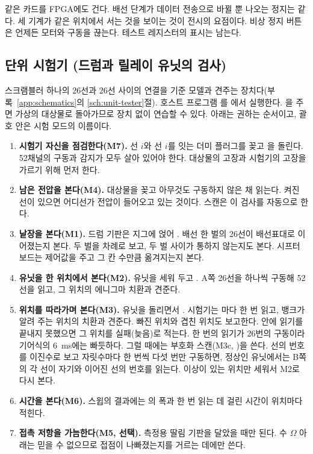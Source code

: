같은 카드를 FPGA에도 건다. 배선 단계가 데이터 전송으로 바뀔 뿐 나오는 정지는 같다. 세 기계가 같은 위치에서
서는 것을 보이는 것이 전시의 요점이다. 비상 정지 버튼은 언제든 모터와 구동을 끊는다. 테스트 레지스터의 표시는
남는다.

\subsection{단위 시험기 (드럼과 릴레이 유닛의 검사)}

스크램블러 하나의 26선과 26선 사이의 연결을 기준 모델과 견주는 장치다(부록~\ref{app:schematics}의
\ref{sch:unit-tester}절). 호스트 프로그램 를
에서 실행한다. 을 주면 가상의 대상물로 돌아가므로 장치 없이
연습할 수 있다. 아래는 권하는 순서이고, 괄호 안은 시험 모드의 이름이다.

\begin{enumerate}
\item \textbf{시험기 자신을 점검한다(M7).} 선 $i$와 선 $i$를 잇는 더미 플러그를 꽂고 을
돌린다. 52채널의 구동과 감지가 모두 살아 있어야 한다. 대상물의 고장과 시험기의 고장을 가르기 위해 먼저 한다.
\item \textbf{남은 전압을 본다(M4).} 대상물을 꽂고 아무것도 구동하지 않은 채 읽는다. 켜진 선이 있으면 어디선가
전압이 들어오고 있는 것이다. 스캔은 이 검사를 자동으로 한다.
\item \textbf{낱장을 본다(M1).} 드럼 기판은 지그에 얹어 . 배선 한 벌의 26선이
배선표대로 이어졌는지 본다. 두 벌을 차례로 보고, 두 벌 사이가 통하지 않는지도 본다. 시프터 보드는 제어값을
주고 그 칸 수만큼 옮겨지는지 본다.
\item \textbf{유닛을 한 위치에서 본다(M2).} 유닛을 세워 두고 . A쪽
26선을 하나씩 구동해 52선을 읽고, 그 위치의 에니그마 치환과 견준다.
\item \textbf{위치를 따라가며 본다(M3).} 유닛을 돌리면서 . 시험기는
마다 한 번 읽고, 뱅크가 알려 주는 위치의 치환과 견준다. 빠진 위치와 겹친 위치도 보고한다.
 안에 읽기를 끝내지 못했으면 그 위치를 실패(늦음)로 적는다. 한 번의 읽기가 26번의 구동이라
기어식의 6~ms에는 빠듯하다. 그럴 때에는 부호화 스캔(M3c, )을 쓴다. 선의 번호를 이진수로 보고
자릿수마다 한 번씩 다섯 번만 구동하면, 정상인 유닛에서는 B쪽의 각 선이 자기와 이어진 선의 번호를 읽는다.
이상이 있는 위치만 세워서 M2로 다시 본다.
\item \textbf{시간을 본다(M6).} 스윕의 결과에는 의 폭과 한 번 읽는 데 걸린 시간이 위치마다 적힌다.
\item \textbf{접촉 저항을 가늠한다(M5, 선택).} 측정용 딸림 기판을 달았을 때만 된다. 수 $\Omega$ 아래는 믿을 수
없으므로 접점이 나빠졌는지를 거르는 데에만 쓴다.
\end{enumerate}

